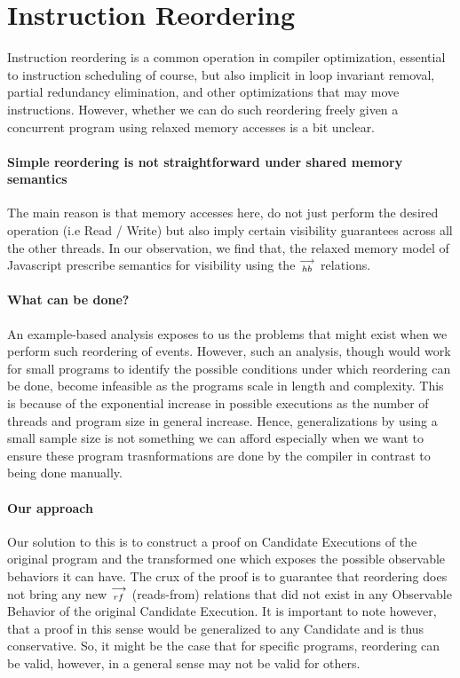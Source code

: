 
\section{Instruction Reordering}
    Instruction reordering is a common operation in compiler optimization, essential to instruction scheduling of course, but also implicit in loop invariant removal, partial redundancy elimination, and other optimizations that may move instructions. 
    However, whether we can do such reordering freely given a concurrent program using relaxed memory accesses is a bit unclear. 
     
    
    \paragraph{Simple reordering is not straightforward under shared memory semantics}
    The main reason is that memory accesses here, do not just perform the desired operation (i.e Read / Write) but also imply certain visibility guarantees across all the other threads.  
    In our observation, we find that, the relaxed memory model of Javascript prescribe semantics for visibility using the $\stackrel{\longrightarrow}{_{hb}}$ relations. 
    
    
    \paragraph{What can be done?}
    An example-based analysis exposes to us the problems that might exist when we perform such reordering of events. 
    However, such an analysis, though would work for small programs to identify the possible conditions under which reordering can be done, become infeasible as the programs scale in length and complexity. 
    This is because of the exponential increase in possible executions as the number of threads and program size in general increase. 
    Hence,  generalizations by using a small sample size is not something we can afford especially when we want to ensure these program trasnformations are done by the compiler in contrast to being done manually.
    
    \paragraph{Our approach}
    Our solution to this is to construct a proof on Candidate Executions of the original program and the transformed one which exposes the possible observable behaviors it can have.   
    The crux of the proof is to guarantee that reordering does not bring any new $\stackrel{\longrightarrow}{_{rf}}$ (reads-from) relations that did not exist in any Observable Behavior of the original Candidate Execution. 
    It is important to note however, that a proof in this sense would be generalized to any Candidate and is thus conservative.
    So, it might be the case that for specific programs, reordering can be valid, however, in a general sense may not be valid for others. 


